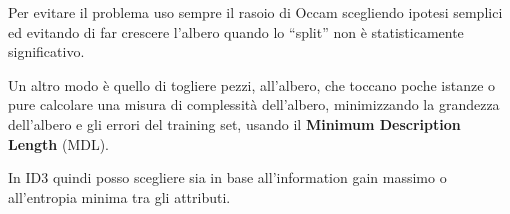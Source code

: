 Per evitare il problema uso sempre il rasoio di Occam scegliendo ipotesi semplici
ed evitando di far crescere l'albero quando lo “split” non è statisticamente
significativo.

Un altro modo è quello di togliere pezzi, all'albero, che toccano poche istanze
o pure calcolare una misura di complessità dell'albero, minimizzando la grandezza
dell'albero e gli errori del training set, usando il \textbf{Minimum Description
    Length} (MDL).

In ID3 quindi posso scegliere sia in base all'information gain massimo o
all'entropia minima tra gli attributi.